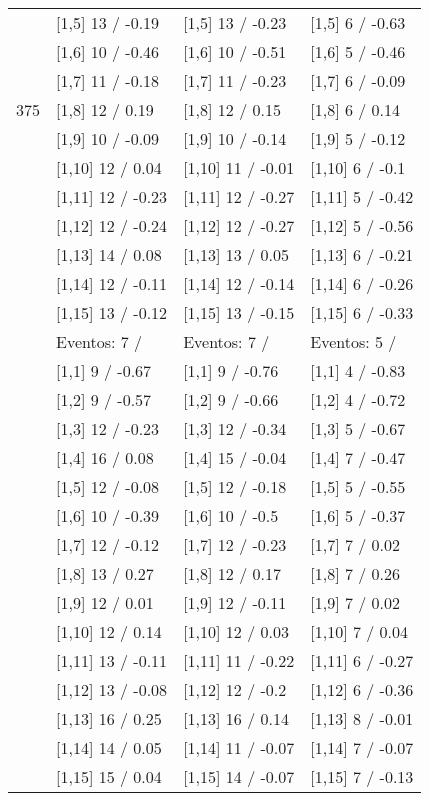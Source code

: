 \begin{table}
\begin{tabular}[t]{llll}
 & {}[1,5] 13  / -0.19 & {}[1,5] 13  / -0.23 & {}[1,5] 6  / -0.63\\
 & {}[1,6] 10  / -0.46 & {}[1,6] 10  / -0.51 & {}[1,6] 5  / -0.46\\
 & {}[1,7] 11  / -0.18 & {}[1,7] 11  / -0.23 & {}[1,7] 6  / -0.09\\
375 & {}[1,8] 12  / 0.19 & {}[1,8] 12  / 0.15 & {}[1,8] 6  / 0.14\\
\addlinespace
 & {}[1,9] 10  / -0.09 & {}[1,9] 10  / -0.14 & {}[1,9] 5  / -0.12\\
 & {}[1,10] 12  / 0.04 & {}[1,10] 11  / -0.01 & {}[1,10] 6  / -0.1\\
 & {}[1,11] 12  / -0.23 & {}[1,11] 12  / -0.27 & {}[1,11] 5  / -0.42\\
 & {}[1,12] 12  / -0.24 & {}[1,12] 12  / -0.27 & {}[1,12] 5  / -0.56\\
 & {}[1,13] 14  / 0.08 & {}[1,13] 13  / 0.05 & {}[1,13] 6  / -0.21\\
\addlinespace
 & {}[1,14] 12  / -0.11 & {}[1,14] 12  / -0.14 & {}[1,14] 6  / -0.26\\
 & {}[1,15] 13  / -0.12 & {}[1,15] 13  / -0.15 & {}[1,15] 6  / -0.33\\
 & Eventos:  7 / & Eventos:  7 / & Eventos:  5 /\\
 & {}[1,1] 9  / -0.67 & {}[1,1] 9  / -0.76 & {}[1,1] 4  / -0.83\\
 & {}[1,2] 9  / -0.57 & {}[1,2] 9  / -0.66 & {}[1,2] 4  / -0.72\\
\addlinespace
 & {}[1,3] 12  / -0.23 & {}[1,3] 12  / -0.34 & {}[1,3] 5  / -0.67\\
 & {}[1,4] 16  / 0.08 & {}[1,4] 15  / -0.04 & {}[1,4] 7  / -0.47\\
 & {}[1,5] 12  / -0.08 & {}[1,5] 12  / -0.18 & {}[1,5] 5  / -0.55\\
 & {}[1,6] 10  / -0.39 & {}[1,6] 10  / -0.5 & {}[1,6] 5  / -0.37\\
 & {}[1,7] 12  / -0.12 & {}[1,7] 12  / -0.23 & {}[1,7] 7  / 0.02\\
\addlinespace
500 & {}[1,8] 13  / 0.27 & {}[1,8] 12  / 0.17 & {}[1,8] 7  / 0.26\\
 & {}[1,9] 12  / 0.01 & {}[1,9] 12  / -0.11 & {}[1,9] 7  / 0.02\\
 & {}[1,10] 12  / 0.14 & {}[1,10] 12  / 0.03 & {}[1,10] 7  / 0.04\\
 & {}[1,11] 13  / -0.11 & {}[1,11] 11  / -0.22 & {}[1,11] 6  / -0.27\\
 & {}[1,12] 13  / -0.08 & {}[1,12] 12  / -0.2 & {}[1,12] 6  / -0.36\\
\addlinespace
 & {}[1,13] 16  / 0.25 & {}[1,13] 16  / 0.14 & {}[1,13] 8  / -0.01\\
 & {}[1,14] 14  / 0.05 & {}[1,14] 11  / -0.07 & {}[1,14] 7  / -0.07\\
 & {}[1,15] 15  / 0.04 & {}[1,15] 14  / -0.07 & {}[1,15] 7  / -0.13\\
\bottomrule
\end{tabular}
\end{table}
